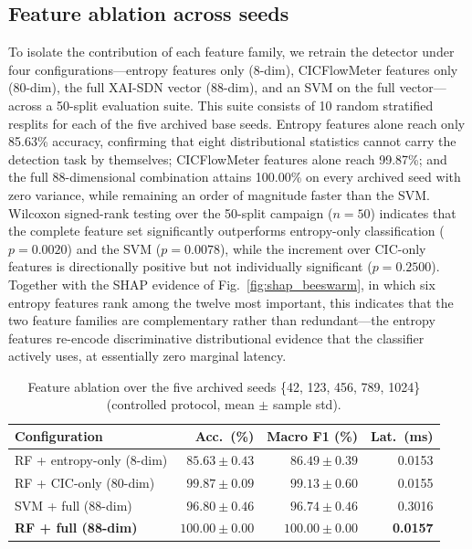 \documentclass{ieeeaccess}
\begin{document}
\subsection{Feature ablation across seeds}
To isolate the contribution of each feature family, we retrain the detector under four configurations---entropy features only (8-dim), CICFlowMeter features only (80-dim), the full XAI-SDN vector (88-dim), and an SVM on the full vector---across a 50-split evaluation suite. This suite consists of 10 random stratified resplits for each of the five archived base seeds. Entropy features alone reach only 85.63\% accuracy, confirming that eight distributional statistics cannot carry the detection task by themselves; CICFlowMeter features alone reach 99.87\%; and the full 88-dimensional combination attains 100.00\% on every archived seed with zero variance, while remaining an order of magnitude faster than the SVM. Wilcoxon signed-rank testing over the 50-split campaign ($n=50$) indicates that the complete feature set significantly outperforms entropy-only classification ($p=0.0020$) and the SVM ($p=0.0078$), while the increment over CIC-only features is directionally positive but not individually significant ($p=0.2500$). Together with the SHAP evidence of Fig.~\ref{fig:shap_beeswarm}, in which six entropy features rank among the twelve most important, this indicates that the two feature families are complementary rather than redundant---the entropy features re-encode discriminative distributional evidence that the classifier actively uses, at essentially zero marginal latency.

\begin{table}
\caption{Feature ablation over the five archived seeds \{42, 123, 456, 789, 1024\} (controlled protocol, mean $\pm$ sample std).}
\centering
\label{tab:ablation}
\small
\setlength{\tabcolsep}{3.5pt}
\begin{tabular}{@{}lrrr@{}}
\toprule
\textbf{Configuration} & \textbf{Acc.\ (\%)} & \textbf{Macro F1 (\%)} & \textbf{Lat.\ (ms)} \\
\midrule
RF + entropy-only (8-dim) & $85.63 \pm 0.43$ & $86.49 \pm 0.39$ & 0.0153 \\
RF + CIC-only (80-dim) & $99.87 \pm 0.09$ & $99.13 \pm 0.60$ & 0.0155 \\
SVM + full (88-dim) & $96.80 \pm 0.46$ & $96.74 \pm 0.46$ & 0.3016 \\
\textbf{RF + full (88-dim)} & $\mathbf{100.00 \pm 0.00}$ & $\mathbf{100.00 \pm 0.00}$ & \textbf{0.0157} \\
\bottomrule
\end{tabular}
\end{table}
\end{document}
